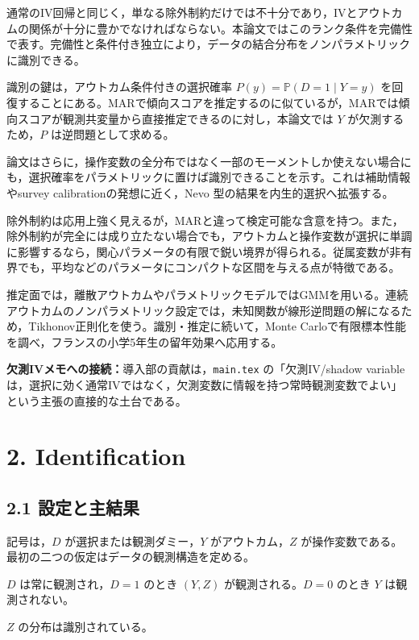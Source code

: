 \documentclass[10pt,a4paper]{article}
\newcommand{\Prb}{\mathbb{P}}
\newcommand{\connect}[1]{\par\smallskip\noindent\textbf{欠測IVメモへの接続：}#1\par\smallskip}
\begin{document}
通常のIV回帰と同じく，単なる除外制約だけでは不十分であり，IVとアウトカムの関係が十分に豊かでなければならない。本論文ではこのランク条件を完備性で表す。完備性と条件付き独立により，データの結合分布をノンパラメトリックに識別できる。

識別の鍵は，アウトカム条件付きの選択確率 $P(y)=\Prb(D=1\mid Y=y)$ を回復することにある。MARで傾向スコアを推定するのに似ているが，MARでは傾向スコアが観測共変量から直接推定できるのに対し，本論文では $Y$ が欠測するため，$P$ は逆問題として求める。

論文はさらに，操作変数の全分布ではなく一部のモーメントしか使えない場合にも，選択確率をパラメトリックに置けば識別できることを示す。これは補助情報やsurvey calibrationの発想に近く，Nevo 型の結果を内生的選択へ拡張する。

除外制約は応用上強く見えるが，MARと違って検定可能な含意を持つ。また，除外制約が完全には成り立たない場合でも，アウトカムと操作変数が選択に単調に影響するなら，関心パラメータの有限で鋭い境界が得られる。従属変数が非有界でも，平均などのパラメータにコンパクトな区間を与える点が特徴である。

推定面では，離散アウトカムやパラメトリックモデルではGMMを用いる。連続アウトカムのノンパラメトリック設定では，未知関数が線形逆問題の解になるため，Tikhonov正則化を使う。識別・推定に続いて，Monte Carloで有限標本性能を調べ，フランスの小学5年生の留年効果へ応用する。

\connect{導入部の貢献は，\texttt{main.tex} の「欠測IV/shadow variableは，選択に効く通常IVではなく，欠測変数に情報を持つ常時観測変数でよい」という主張の直接的な土台である。}

\section{2. Identification}

\subsection{2.1 設定と主結果}

記号は，$D$ が選択または観測ダミー，$Y$ がアウトカム，$Z$ が操作変数である。最初の二つの仮定はデータの観測構造を定める。

\begin{description}[leftmargin=3.2em]
\item[仮定1] $D$ は常に観測され，$D=1$ のとき $(Y,Z)$ が観測される。$D=0$ のとき $Y$ は観測されない。
\item[仮定2] $Z$ の分布は識別されている。
\end{description}
\end{document}
